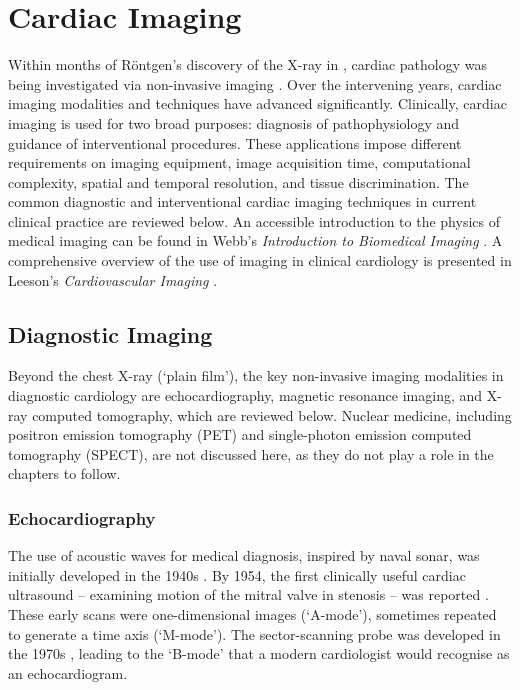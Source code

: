 \section{Cardiac Imaging}\label{app:imaging}

Within months of Röntgen's discovery of the X-ray in \cite{gagliardi_rontgen_1996}, cardiac pathology was being investigated via non-invasive imaging \cite{gagliardi_cardiac_1996}.  Over the intervening years, cardiac imaging modalities and techniques have advanced significantly.  Clinically, cardiac imaging is used for two broad purposes: diagnosis of pathophysiology and guidance of interventional procedures.  These applications impose different requirements on imaging equipment, image acquisition time, computational complexity, spatial and temporal resolution, and tissue discrimination.  The common diagnostic and interventional cardiac imaging techniques in current clinical practice are reviewed below.  An accessible introduction to the physics of medical imaging can be found in Webb's \textit{Introduction to Biomedical Imaging} \cite{webb_introduction_2002}.  A comprehensive overview of the use of imaging in clinical cardiology is presented in Leeson's \textit{Cardiovascular Imaging} \cite{leeson_cardiovascular_2011}.

\subsection{Diagnostic Imaging}
\label{sub:diagnostic}

Beyond the chest X-ray (`plain film'), the key non-invasive imaging modalities in diagnostic cardiology are echocardiography, magnetic resonance imaging, and X-ray computed tomography, which are reviewed below.  Nuclear medicine, including positron emission tomography (PET) and single-photon emission computed tomography (SPECT), are not discussed here, as they do not play a role in the chapters to follow.

\subsubsection{Echocardiography}


The use of acoustic waves for medical diagnosis, inspired by naval sonar, was initially developed in the 1940s \cite{gagliardi_ultrasonography_1996}.  By 1954, the first clinically useful cardiac ultrasound -- examining motion of the mitral valve in stenosis -- was reported \cite{edler_ultrasonic_1957}.  These early scans were one-dimensional images (`A-mode'), sometimes repeated to generate a time axis (`M-mode').   The sector-scanning probe was developed in the 1970s \cite{bom_ultrasonic_1971,griffith_sector_1974}, leading to the `B-mode' that a modern cardiologist would recognise as an echocardiogram.
